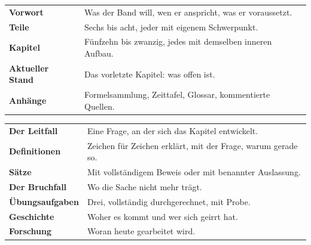 \begin{merksatz}
\begin{center}
{\small
\renewcommand{\arraystretch}{1.5}
\begin{tabular}{@{}P{2.6cm}P{6.0cm}@{}}
\toprule
\textbf{Vorwort} & Was der Band will, wen er anspricht, was er voraussetzt.\\
\textbf{Teile} & Sechs bis acht, jeder mit eigenem Schwerpunkt.\\
\textbf{Kapitel} & Fünfzehn bis zwanzig, jedes mit demselben inneren Aufbau.\\
\textbf{Aktueller Stand} & Das vorletzte Kapitel: was offen ist.\\
\textbf{Anhänge} & Formelsammlung, Zeittafel, Glossar, kommentierte Quellen.\\
\bottomrule
\end{tabular}}
\end{center}

\begin{center}
{\small
\renewcommand{\arraystretch}{1.5}
\begin{tabular}{@{}P{3.0cm}P{5.6cm}@{}}
\toprule
\textbf{Der Leitfall} & Eine Frage, an der sich das Kapitel entwickelt.\\
\textbf{Definitionen} & Zeichen für Zeichen erklärt, mit der Frage, warum gerade so.\\
\textbf{Sätze} & Mit vollständigem Beweis oder mit benannter Auslassung.\\
\textbf{Der Bruchfall} & Wo die Sache nicht mehr trägt.\\
\textbf{Übungsaufgaben} & Drei, vollständig durchgerechnet, mit Probe.\\
\textbf{Geschichte} & Woher es kommt und wer sich geirrt hat.\\
\textbf{Forschung} & Woran heute gearbeitet wird.\\
\bottomrule
\end{tabular}}
\end{center}

\begin{center}
\begin{minipage}{0.88\textwidth}
\end{minipage}
\end{center}
\end{merksatz}


